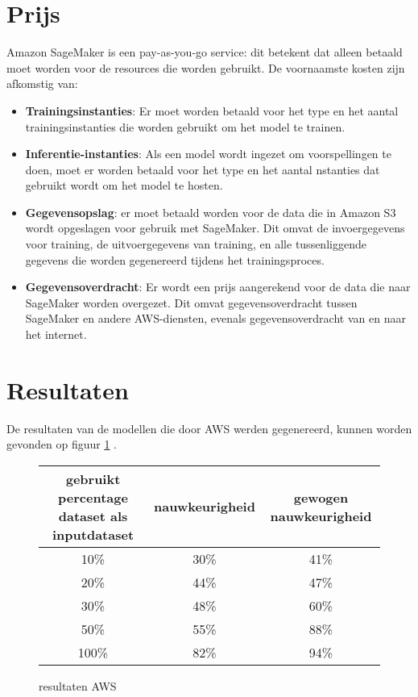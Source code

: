 \section{Prijs}
Amazon SageMaker is een pay-as-you-go service: dit betekent dat  alleen betaald moet worden voor de resources die worden gebruikt. De voornaamste kosten zijn afkomstig van:
\begin{itemize}
    \item \textbf{Trainingsinstanties}: Er moet worden betaald voor het type en het aantal trainingsinstanties die worden gebruikt om het model te trainen.
    
    \item \textbf{ Inferentie-instanties}: Als  een model wordt ingezet om voorspellingen te doen, moet er worden betaald voor het type en het aantal nstanties dat gebruikt wordt om het model te hosten.
    
    \item \textbf{Gegevensopslag}: er moet betaald worden voor de data die in Amazon S3 wordt opgeslagen voor gebruik met SageMaker. Dit omvat de invoergegevens voor training, de uitvoergegevens van training, en alle tussenliggende gegevens die worden gegenereerd tijdens het trainingsproces.
    
    \item\textbf{ Gegevensoverdracht}: Er wordt een prijs aangerekend voor de data die naar SageMaker worden overgezet. Dit omvat gegevensoverdracht tussen SageMaker en andere AWS-diensten, evenals gegevensoverdracht van en naar het internet.
\end{itemize}


\section{Resultaten}
De resultaten van de modellen die door AWS werden gegenereerd, kunnen worden gevonden op figuur \ref{AWSResultTable} .
\begin{center}
    \begin{figure}
        \caption{resultaten AWS}
        \label{AWSResultTable}
        \begin{tabular} {|c | c | c |}
            \hline
            gebruikt percentage dataset als inputdataset & nauwkeurigheid & gewogen nauwkeurigheid \\
            \hline
            10\% & 30\% & 41\% \\
            \hline
            20\% & 44\% & 47\% \\
            \hline
            30\% & 48\% & 60\% \\
            \hline
            50\% & 55\% & 88\% \\
            \hline
            100\% & 82\% & 94\% \\
            \hline
        \end{tabular}
    \end{figure}
\end{center}
    


